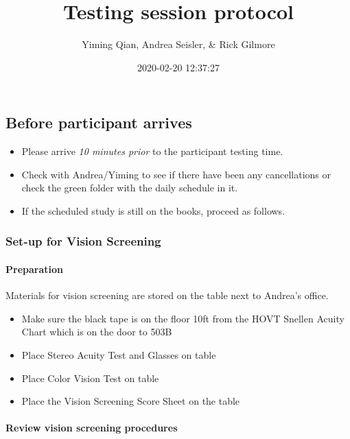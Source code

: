 \documentclass[]{article}
\title{Testing session protocol}
\author{Yiming Qian, Andrea Seisler, \& Rick Gilmore}
\date{2020-02-20 12:37:27}
\providecommand{\tightlist}{%
  \setlength{\itemsep}{0pt}\setlength{\parskip}{0pt}}
\let\oldparagraph\paragraph
\renewcommand{\paragraph}[1]{\oldparagraph{#1}\mbox{}}
\begin{document}
\maketitle

{
\setcounter{tocdepth}{3}
\tableofcontents
}
\hypertarget{before-participant-arrives}{%
\subsection{Before participant
arrives}\label{before-participant-arrives}}

\begin{itemize}
\tightlist
\item
  Please arrive \emph{10 minutes prior} to the participant testing time.
\item
  Check with Andrea/Yiming to see if there have been any cancellations
  or check the green folder with the daily schedule in it.
\item
  If the scheduled study is still on the books, proceed as follows.
\end{itemize}

\hypertarget{set-up-for-vision-screening}{%
\subsubsection{Set-up for Vision
Screening}\label{set-up-for-vision-screening}}

\hypertarget{preparation}{%
\paragraph{Preparation}\label{preparation}}

Materials for vision screening are stored on the table next to Andrea's
office.

\begin{itemize}
\tightlist
\item
  Make sure the black tape is on the floor 10ft from the HOVT Snellen
  Acuity Chart which is on the door to 503B
\item
  Place Stereo Acuity Test and Glasses on table
\item
  Place Color Vision Test on table
\item
  Place the Vision Screening Score Sheet on the table
\end{itemize}

\hypertarget{review-vision-screening-procedures}{%
\paragraph{Review vision screening
procedures}\label{review-vision-screening-procedures}}
\end{document}
